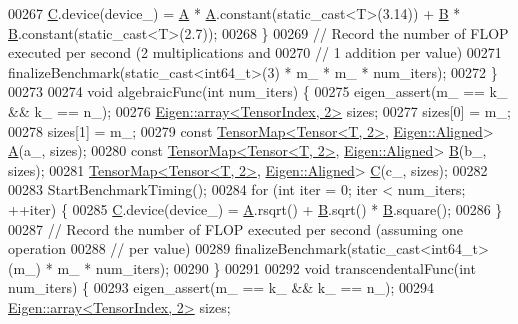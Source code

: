 \begin{DoxyCode}
00267       \hyperlink{group___core___module}{C}.device(device\_) = \hyperlink{group___core___module_class_eigen_1_1_matrix}{A} * \hyperlink{group___core___module_class_eigen_1_1_matrix}{A}.constant(static\_cast<T>(3.14)) + \hyperlink{group___core___module_class_eigen_1_1_matrix}{B} * \hyperlink{group___core___module_class_eigen_1_1_matrix}{B}.constant(static\_cast<T>(2.7));
00268     \}
00269     \textcolor{comment}{// Record the number of FLOP executed per second (2 multiplications and}
00270     \textcolor{comment}{// 1 addition per value)}
00271     finalizeBenchmark(static\_cast<int64\_t>(3) * m\_ * m\_ * num\_iters);
00272   \}
00273 
00274   \textcolor{keywordtype}{void} algebraicFunc(\textcolor{keywordtype}{int} num\_iters) \{
00275     eigen\_assert(m\_ == k\_ && k\_ == n\_);
00276     \hyperlink{class_eigen_1_1array}{Eigen::array<TensorIndex, 2>} sizes;
00277     sizes[0] = m\_;
00278     sizes[1] = m\_;
00279     \textcolor{keyword}{const} \hyperlink{class_eigen_1_1_tensor_map}{TensorMap<Tensor<T, 2>}, \hyperlink{group__enums_gga45fe06e29902b7a2773de05ba27b47a1ad37d4c71425bb286e9b4103830538fbf}{Eigen::Aligned}> 
      \hyperlink{group___core___module_class_eigen_1_1_matrix}{A}(a\_, sizes);
00280     \textcolor{keyword}{const} \hyperlink{class_eigen_1_1_tensor_map}{TensorMap<Tensor<T, 2>}, \hyperlink{group__enums_gga45fe06e29902b7a2773de05ba27b47a1ad37d4c71425bb286e9b4103830538fbf}{Eigen::Aligned}> 
      \hyperlink{group___core___module_class_eigen_1_1_matrix}{B}(b\_, sizes);
00281     \hyperlink{class_eigen_1_1_tensor_map}{TensorMap<Tensor<T, 2>}, \hyperlink{group__enums_gga45fe06e29902b7a2773de05ba27b47a1ad37d4c71425bb286e9b4103830538fbf}{Eigen::Aligned}> 
      \hyperlink{group___core___module}{C}(c\_, sizes);
00282 
00283     StartBenchmarkTiming();
00284     \textcolor{keywordflow}{for} (\textcolor{keywordtype}{int} iter = 0; iter < num\_iters; ++iter) \{
00285       \hyperlink{group___core___module}{C}.device(device\_) = \hyperlink{group___core___module_class_eigen_1_1_matrix}{A}.rsqrt() + \hyperlink{group___core___module_class_eigen_1_1_matrix}{B}.sqrt() * \hyperlink{group___core___module_class_eigen_1_1_matrix}{B}.square();
00286     \}
00287     \textcolor{comment}{// Record the number of FLOP executed per second (assuming one operation}
00288     \textcolor{comment}{// per value)}
00289     finalizeBenchmark(static\_cast<int64\_t>(m\_) * m\_ * num\_iters);
00290   \}
00291 
00292   \textcolor{keywordtype}{void} transcendentalFunc(\textcolor{keywordtype}{int} num\_iters) \{
00293     eigen\_assert(m\_ == k\_ && k\_ == n\_);
00294     \hyperlink{class_eigen_1_1array}{Eigen::array<TensorIndex, 2>} sizes;

\end{DoxyCode}
